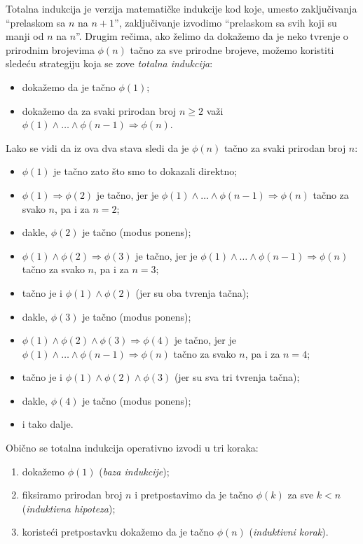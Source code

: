 Totalna indukcija je verzija matemati\v cke indukcije kod koje, umesto zaklju\v civanja \enquote{prelaskom sa $n$ na $n + 1$},
zaklju\v civanje izvodimo \enquote{prelaskom sa svih koji su manji od $n$ na $n$}. Drugim re\v cima,
ako \v zelimo da doka\v zemo da je neko tvr\dj enje o prirodnim brojevima $\phi(n)$ ta\v cno za sve prirodne brojeve, mo\v zemo
koristiti slede\'cu strategiju koja se zove \emph{totalna indukcija}:
\begin{itemize}\itemsep -1pt
\item doka\v zemo da je ta\v cno $\phi(1)$;
\item doka\v zemo da za svaki prirodan broj $n \ge 2$ va\v zi $\phi(1) \land \ldots \land \phi(n - 1) \Rightarrow \phi(n)$.
\end{itemize}
Lako se vidi da iz ova dva stava sledi da je $\phi(n)$ ta\v cno za svaki prirodan broj $n$:
\begin{itemize}\itemsep -1pt
\item $\phi(1)$ je ta\v cno zato \v sto smo to dokazali direktno;
\item $\phi(1) \Rightarrow \phi(2)$ je ta\v cno, jer je $\phi(1) \land \ldots \land \phi(n - 1) \Rightarrow \phi(n)$ ta\v cno za svako $n$, pa i za $n = 2$;
\item dakle, $\phi(2)$ je ta\v cno (modus ponens);
\item $\phi(1) \land \phi(2) \Rightarrow \phi(3)$ je ta\v cno, jer je $\phi(1) \land \ldots \land \phi(n - 1) \Rightarrow \phi(n)$ ta\v cno za svako $n$, pa i za $n = 3$;
\item ta\v cno je i $\phi(1) \land \phi(2)$ (jer su oba tvr\dj enja ta\v cna);
\item dakle, $\phi(3)$ je ta\v cno (modus ponens);
\item $\phi(1) \land \phi(2) \land \phi(3) \Rightarrow \phi(4)$ je ta\v cno, jer je $\phi(1) \land \ldots \land \phi(n - 1) \Rightarrow \phi(n)$ ta\v cno za svako $n$, pa i za $n = 4$;
\item ta\v cno je i $\phi(1) \land \phi(2) \land \phi(3)$ (jer su sva tri tvr\dj enja ta\v cna);
\item dakle, $\phi(4)$ je ta\v cno (modus ponens);
\item i tako dalje.
\end{itemize}
Obi\v cno se totalna indukcija operativno izvodi u tri koraka:
\begin{enumerate}\itemsep -1pt
\item doka\v zemo $\phi(1)$ (\emph{baza indukcije});
\item fiksiramo prirodan broj $n$ i pretpostavimo da je ta\v cno $\phi(k)$ za sve $k < n$\newline
      (\emph{induktivna hipoteza});
\item koriste\'ci pretpostavku doka\v zemo da je ta\v cno $\phi(n)$ (\emph{induktivni korak}).
\end{enumerate}

